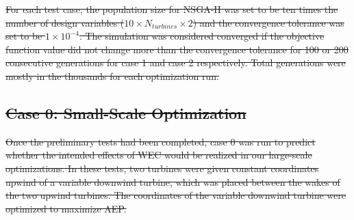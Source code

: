 \documentclass[a4paper]{jpconf}
\providecommand{\DIFdel}[1]{{\protect\color{red}\sout{#1}}}                      %
\begin{document}
\DIFdel{For each test case, the population size for NSGA-II was set to be ten times the number of design variables ($10\times N_{turbines} \times 2$) and the convergence tolerance was set to be $1\times10^{-4}$. The simulation was considered converged if the objective function value did not change more than the convergence tolerance for 100 or 200 consecutive generations for case 1 and case 2 respectively. Total generations were mostly in the thousands for each optimization run.
}%



\subsection{\DIFdel{Case 0: Small-Scale Optimization}}
\addtocounter{subsection}{-1}%
\DIFdel{Once the preliminary tests had been completed, case 0 was run to predict whether the intended effects of WEC would be realized in our large-scale optimizations. In these tests, two turbines were given constant coordinates upwind of a variable downwind turbine, which was placed between the wakes of the two upwind turbines. The coordinates of the variable downwind turbine were optimized to maximize AEP.
}%
\end{document}
